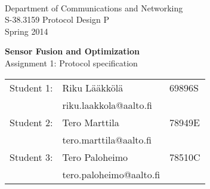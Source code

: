 \begin{titlepage}

\begin{flushleft}
 \\
Department of Communications and Networking \\
S-38.3159 Protocol Design P \\
Spring 2014
\end{flushleft}

\vspace{8cm}
\begin{center}
  {\LARGE \textbf{Sensor Fusion and Optimization}}\\
  {\LARGE Assignment 1: Protocol specification}
\end{center}

\vfill

\begin{center}
\begin{tabular}{rll}
	Student 1:	& Riku Lääkkölä 	& 69896S \\
				& riku.laakkola@aalto.fi & \\    
    Student 2: 	& Tero Marttila		& 78949E \\
    			& tero.marttila@aalto.fi & \\
    Student 3:	& Tero Paloheimo	& 78510C \\
    			& tero.paloheimo@aalto.fi & \\
\end{tabular}
\end{center}

\end{titlepage}